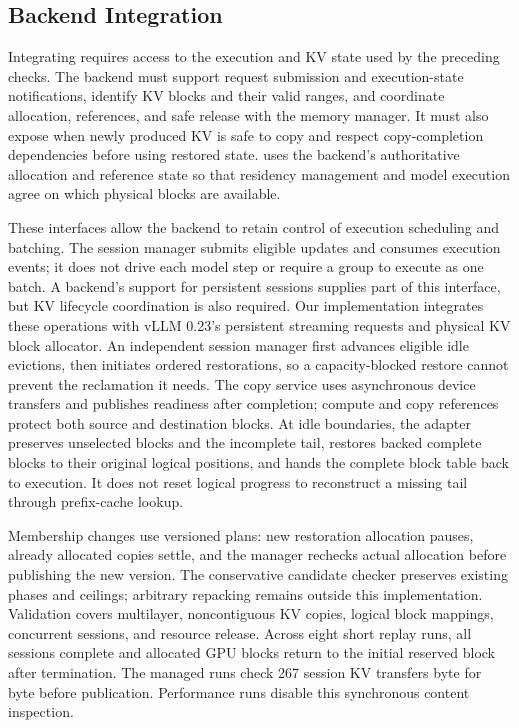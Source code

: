 \subsection{Backend Integration}
\label{sec:implementation}

Integrating \systemname requires access to the execution and KV state used by the preceding checks.
The backend must support request submission and execution-state notifications, identify KV blocks and their valid ranges, and coordinate allocation, references, and safe release with the memory manager.
It must also expose when newly produced KV is safe to copy and respect copy-completion dependencies before using restored state.
\systemname uses the backend's authoritative allocation and reference state so that residency management and model execution agree on which physical blocks are available.

These interfaces allow the backend to retain control of execution scheduling and batching.
The session manager submits eligible updates and consumes execution events; it does not drive each model step or require a group to execute as one batch.
A backend's support for persistent sessions supplies part of this interface, but KV lifecycle coordination is also required.
Our implementation integrates these operations with vLLM 0.23's persistent streaming requests and physical KV block allocator.
An independent session manager first advances eligible idle evictions, then initiates ordered restorations, so a capacity-blocked restore cannot prevent the reclamation it needs.
The copy service uses asynchronous device transfers and publishes readiness after completion; compute and copy references protect both source and destination blocks.
At idle boundaries, the adapter preserves unselected blocks and the incomplete tail, restores backed complete blocks to their original logical positions, and hands the complete block table back to execution.
It does not reset logical progress to reconstruct a missing tail through prefix-cache lookup.

Membership changes use versioned plans: new restoration allocation pauses, already allocated copies settle, and the manager rechecks actual allocation before publishing the new version.
The conservative candidate checker preserves existing phases and ceilings; arbitrary repacking remains outside this implementation.
Validation covers multilayer, noncontiguous KV copies, logical block mappings, concurrent sessions, and resource release.
Across eight short replay runs, all sessions complete and allocated GPU blocks return to the initial reserved block after termination.
The managed runs check 267 session KV transfers byte for byte before publication.
Performance runs disable this synchronous content inspection.
